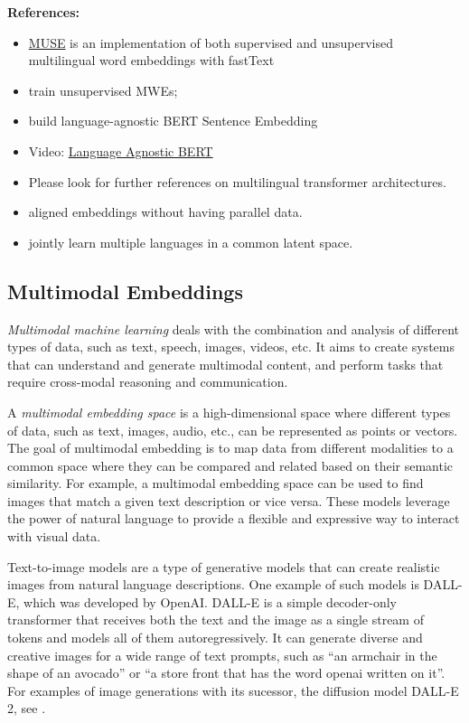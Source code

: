 \documentclass[11pt, a4paper]{amsart}
\begin{document}
\noindent \textbf{References:}
\begin{itemize}
	\item \href{https://github.com/facebookresearch/MUSE}{MUSE} is an implementation of both supervised and unsupervised multilingual word embeddings with fastText
	\item \cite{DBLP:journals/corr/abs-1808-08933} train unsupervised MWEs;
	\item \cite{DBLP:journals/corr/abs-2007-01852} build language-agnostic BERT Sentence Embedding
	\item Video: \href{https://youtu.be/7tAWk_Coj-s}{Language Agnostic BERT}
	\item Please look for further references on multilingual transformer architectures.
	\item \cite{DBLP:journals/corr/abs-1710-04087} aligned embeddings without having parallel data.
	\item \cite{10.1162/tacl_a_00257} jointly learn multiple languages in a common latent space.
\end{itemize}

\subsection{Multimodal Embeddings}

\emph{Multimodal machine learning} deals with the combination and analysis of different types of data, such as text, speech, images, videos, etc. It aims to create systems that can understand and generate multimodal content, and perform tasks that require cross-modal reasoning and communication.

A \emph{multimodal embedding space} is a high-dimensional space where different types of data, such as text, images, audio, etc., can be represented as points or vectors.
The goal of multimodal embedding is to map data from different modalities to a common space where they can be compared and related based on their semantic similarity.
For example, a multimodal embedding space can be used to find images that match a given text description or vice versa.
These models leverage the power of natural language to provide a flexible and expressive way to interact with visual data.

Text-to-image models are a type of generative models that can create realistic images from natural language descriptions.
One example of such models is DALL-E, which was developed by OpenAI.
DALL-E is a simple decoder-only transformer that receives both the text and the image as a single stream of tokens and models all of them autoregressively.
It can generate diverse and creative images for a wide range of text prompts, such as ``an armchair in the shape of an avocado'' or ``a store front that has the word openai written on it''.
For examples of image generations with its sucessor, the diffusion model DALL-E 2, see .
\end{document}

